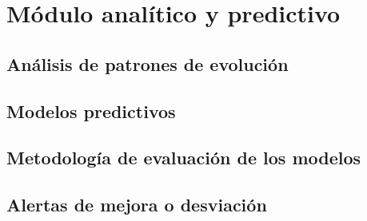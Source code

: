 \chapter{Módulo analítico y predictivo}
\label{ch:predictivo}


\section{Análisis de patrones de evolución}
\label{sec:patrones}

\section{Modelos predictivos}
\label{sec:modelos}

\section{Metodología de evaluación de los modelos}
\label{sec:evaluacion_modelos}

\section{Alertas de mejora o desviación}
\label{sec:alertas}
